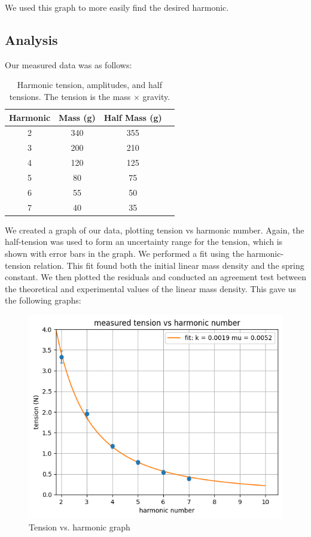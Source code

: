 \documentclass[11pt]{article}
\begin{document}
    We used this graph to more easily find the desired harmonic.

    \subsection{Analysis}\label{subsec:part_2_analysis}

    Our measured data was as follows:
    \begin{table}[H]
        \centering
        \begin{tabular}{|c|c|c|c|}
        \hline
        \textbf{Harmonic} & \textbf{Mass (g)} & \textbf{Half Mass (g)} \\
        \hline
        2 & 340 & 355   \\
        3 & 200 & 210   \\
        4 & 120 & 125   \\
        5 & 80 & 75     \\
        6 & 55 & 50     \\
        7 & 40 & 35     \\
        \hline
        \end{tabular}
        \caption{Harmonic tension, amplitudes, and half tensions. The tension is the mass $\times$ gravity.}
        \label{tab:harmonic_tensions}
    \end{table}

    We created a graph of our data, plotting tension vs harmonic number.
    Again, the half-tension was used to form an uncertainty range for the tension, which is shown with error bars in the graph.
    We performed a fit using the harmonic-tension relation.
    This fit found both the initial linear mass density and the spring constant.
    We then plotted the residuals and conducted an agreement test between the theoretical and experimental values of the linear mass density.
    This gave us the following graphs:

    \begin{figure}[H]
        \includegraphics[width=1\textwidth]{resources/images/p2 measured tension graph}
        \caption{Tension vs. harmonic graph}
        \label{fig:measured_tension}
    \end{figure}
\end{document}
